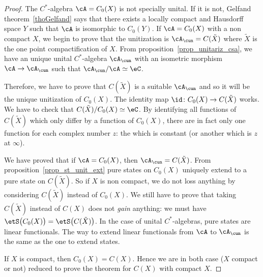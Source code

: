 \begin{proof}
The $C^*$-algebra  $\cA=C_0(X)$ is not specially unital. If it is not, Gelfand theorem~\ref{thoGelfand} says that there exists a locally compact and Hausdorff space $Y$ such that $\cA$ is isomorphic to $C_0(Y)$. If $\cA=C_0(X)$ with a non compact $X$, we begin to prove that the unitization is $\cA_{\cun}=C(\tilde X)$ where $\tilde X$ is the one point compactification of $X$. From proposition~\ref{prop_unitariz_csa}, we have an unique unital $C^*$-algebra $\cA_{\cun}$  with an isometric morphism $\cA\to\cA_{\cun}$ such that $\cA_{\cun}/\cA\simeq \eC$.

 Therefore, we have to prove that $C(\tilde X)$ is a suitable $\cA_{\cun}$ and so it will be the unique unitization of $C_0(X)$. The identity map $\id\colon C_0(X)\to C(\tilde X)$ works. We have to check that $C(\tilde X)/C_0(X)\simeq\eC$. By identifying all functions of $C(\tilde X)$ which only differ by a function of $C_0(X)$, there are in fact only one function for each complex number $z$: the which is constant (or another which is $z$ at $\infty$).

We have proved that if $\cA=C_0(X)$, then $\cA_{\cun}=C(\tilde X)$. From proposition~\ref{prop_st_unit_ext} pure states on $C_0(X)$ uniquely extend to a pure state on $C(\tilde X)$. So if $X$ is non compact, we do not loss anything by considering $C(\tilde X)$ instead of $C_0(X)$. We still have to prove that taking $C(\tilde X)$ instead of $C(X)$ does not \emph{gain} anything: we must have $\etS\big( C_0(X) \big)=\etS\big( C(\tilde X) \big)$. In the case of unital $C^*$-algebras, pure states are linear functionals. The way to extend linear functionals from $\cA$ to $\cA_{\cun}$ is the same as the one to extend states.

If $X$ is compact, then $C_0(X)=C(X)$. Hence we are in both case ($X$ compact or not) reduced to prove the theorem for $C(X)$ with compact $X$.


\end{proof}
